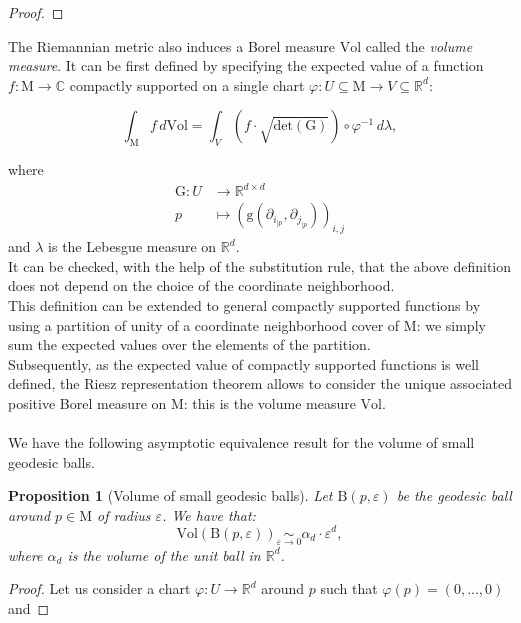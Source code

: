 \documentclass[pdflatex,sn-mathphys-ay]{sn-jnl}%
\newtheorem{proposition}{Proposition}[section]
\newcommand{\man}{\mathrm{M}}
\newcommand{\ball}{{\mathrm {B}}}
\newcommand{\vol}{\mathrm{Vol}}
\newcommand{\g}{\mathrm{g}}
\newcommand{\G}{\mathrm{G}}
\newcommand{\deter}{\mathrm{det}}
\newcommand{\R}{\mathbb{R}}
\newcommand{\eps}{\varepsilon}
\newcommand{\change}[1]{\noindent #1}
\theoremstyle{thmstyleone}%
\begin{document}
\begin{appendices}
\begin{proof}
\end{proof}








The Riemannian metric also induces a Borel measure $\vol$ called the {\it volume measure}. It can be first defined by specifying the expected value of a function $f\colon\man\rightarrow\mathbb{C}$ compactly supported on a single chart $\varphi\colon U\subseteq\man\rightarrow V\subseteq\mathbb{R}^d$:

$$\int_{\man}f\,d\vol=\int_{V}\left(f\cdot\sqrt{\deter(\G)}\right)\circ\varphi^{-1}\,d\lambda,$$

where \begin{align*}
\G\colon U&\longrightarrow\mathbb{R}^{d\times d}\\
p&\longmapsto(\g(\partial_{i_{|p}},\partial_{j_{|p}}))_{i,j}
\end{align*}
and $\lambda$ is the Lebesgue measure on $\mathbb{R}^d$.\\
It can be checked, with the help of the substitution rule, that the above definition does not depend on the choice of the coordinate neighborhood.\\
This definition can be extended to general compactly supported functions by using a partition of unity of a coordinate neighborhood cover of $\man$: we simply sum the expected values over the elements of the partition.\\
Subsequently, as the expected value of compactly supported functions is well defined, the Riesz representation theorem allows to consider the unique associated positive Borel measure on $\man$: this is the volume measure $\vol$.\\\\
 We have the following asymptotic equivalence result for the volume of small geodesic balls.
\begin{proposition}[\change{Volume of small geodesic balls}]\label{prop:geo_vol}
Let $\ball(p,\eps)$ be the geodesic ball around $p\in\man$ of radius $\eps$. We have that:
$$\vol\left(\ball(p,\eps)\right)\underset{\eps\rightarrow 0}{\sim} \alpha_d\cdot\eps^d,$$
where $\alpha_d$ is the volume of the unit ball in $\R^d$.
%
\end{proposition}
\begin{proof}
Let us consider a chart $\varphi\colon U\rightarrow\R^d$ around $p$ such that $\varphi(p)=(0,...,0)$ and 


\end{proof}
\end{appendices}
\end{document}
